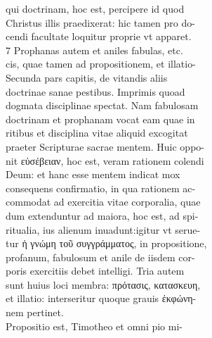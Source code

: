 \documentclass{article}
\begin{document}
\begin{pages}
                qui doctrinam, hoc est, percipere id quod \\
                Christus illis praedixerat: hic tamen pro do- \\
                cendi facultate loquitur proprie vt apparet. \\
                7 Prophanas autem et aniles fabulas, etc. \\
                cis, quae tamen ad propositionem, et illatio- \\
                Secunda pars capitis, de vitandis aliis \\
                doctrinae sanae pestibus. Imprimis quoad \\
                dogmata disciplinae spectat. Nam fabulosam \\
                doctrinam et prophanam vocat eam quae in \\
                ritibus et disciplina vitae aliquid excogitat \\
                praeter Scripturae sacrae mentem. Huic oppo- \\
                nit εὐσέβειαν, hoc est, veram rationem colendi \\
                Deum: et hanc esse mentem indicat mox \\
                consequens confirmatio, in qua rationem ac- \\
                commodat ad exercitia vitae corporalia, quae \\
                dum extenduntur ad maiora, hoc est, ad spi- \\
                ritualia, ius alienum inuadunt:igitur vt serue- \\
                tur ἡ γνώμη τοῦ συγγράμματος, in propositione, \\
                profanum, fabulosum et anile de iisdem cor- \\
                poris exercitiis debet intelligi. Tria autem \\
                sunt huius loci membra: πρότασις, κατασκευη, \\
                et illatio: interseritur quoque grauis ἐκφώνη- \\
                nem pertinet. \\
                Propositio est, Timotheo et omni pio mi- \\

\end{pages}
\end{document}
